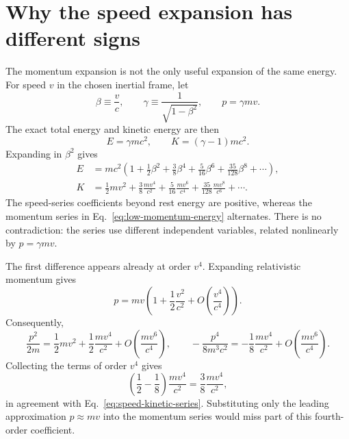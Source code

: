 \documentclass[12pt]{article}
\begin{document}
\section{Why the speed expansion has different signs}

The momentum expansion is not the only useful expansion of the same energy. For speed $v$ in the chosen inertial frame, let
\begin{equation}
  \beta\equiv\frac{v}{c},
  \qquad
  \gamma\equiv\frac{1}{\sqrt{1-\beta^2}},
  \qquad
  p=\gamma mv.
  \label{eq:speed-definitions}
\end{equation}
The exact total energy and kinetic energy are then
\begin{equation}
  E=\gamma mc^2,
  \qquad
  K=(\gamma-1)mc^2.
  \label{eq:total-and-kinetic-energy}
\end{equation}
Expanding in $\beta^2$ gives
\begin{align}
  E&=mc^2\left(1+\frac{1}{2}\beta^2
       +\frac{3}{8}\beta^4+\frac{5}{16}\beta^6
       +\frac{35}{128}\beta^8+\cdots\right),
  \label{eq:speed-energy-series}\\
  K&=\frac{1}{2}mv^2+\frac{3}{8}\frac{mv^4}{c^2}
       +\frac{5}{16}\frac{mv^6}{c^4}
       +\frac{35}{128}\frac{mv^8}{c^6}+\cdots.
  \label{eq:speed-kinetic-series}
\end{align}
The speed-series coefficients beyond rest energy are positive, whereas the momentum series in Eq.~\eqref{eq:low-momentum-energy} alternates. There is no contradiction: the series use different independent variables, related nonlinearly by $p=\gamma mv$.

The first difference appears already at order $v^4$. Expanding relativistic momentum gives
\begin{equation}
  p=mv\left(1+\frac{1}{2}\frac{v^2}{c^2}+O\!\left(\frac{v^4}{c^4}\right)\right).
  \label{eq:momentum-speed-expansion}
\end{equation}
Consequently,
\begin{equation}
  \frac{p^2}{2m}
  =\frac{1}{2}mv^2+\frac{1}{2}\frac{mv^4}{c^2}
   +O\!\left(\frac{mv^6}{c^4}\right),
  \qquad
  -\frac{p^4}{8m^3c^2}
  =-\frac{1}{8}\frac{mv^4}{c^2}
   +O\!\left(\frac{mv^6}{c^4}\right).
  \label{eq:momentum-series-fourth-order-terms}
\end{equation}
Collecting the terms of order $v^4$ gives
\begin{equation}
  \left(\frac{1}{2}-\frac{1}{8}\right)\frac{mv^4}{c^2}
  =\frac{3}{8}\frac{mv^4}{c^2},
  \label{eq:fourth-order-momentum-correction}
\end{equation}
in agreement with Eq.~\eqref{eq:speed-kinetic-series}. Substituting only the leading approximation $p\approx mv$ into the momentum series would miss part of this fourth-order coefficient.
\end{document}
